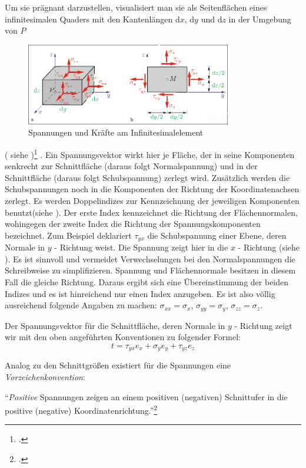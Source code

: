 \documentclass[12pt,a4paper,parskip]{scrartcl}
\begin{document}
{Um sie prägnant darzustellen, visualisiert man sie als Seitenflächen eines infinitesimalen Quaders mit den Kantenlängen d$ x $, d$ y $ und d$ z $ in der Umgebung von $ P $\begin{figure}
  \centering
  \includegraphics[width=0.8\textwidth]{tensor}
  \caption{Spannungen und Kräfte am Infinitesimalelement}
  \label{fig:tensor}
  \end{figure}( siehe )\footcite[Vgl.][44]{tmr} . Ein Spannungsvektor wirkt hier je Fläche, der in seine Komponenten senkrecht zur Schnittfläche (daraus folgt Normalspannung) und in der Schnittfläche (daraus folgt Schubspannung) zerlegt wird. Zusätzlich werden die Schubspannungen noch in die Komponenten der Richtung der Koordinatenachsen zerlegt. Es werden Doppelindizes zur Kennzeichnung der jeweiligen Komponenten benutzt(siehe ). 
Der erste Index kennzeichnet die Richtung der Flächennormalen, wohingegen der zweite Index die Richtung der Spannungskomponenten bezeichnet. Zum Beispiel deklariert $ \tau_{yx} $ die Schubspannung einer Ebene, deren Normale in $y$ - Richtung weist. Die Spannung zeigt hier in die $ x $ - Richtung (siehe ). Es ist sinnvoll und vermeidet Verwechselungen bei den Normalspannungen die Schreibweise zu simplifizieren. Spannung und Flächennormale besitzen in diesem Fall die gleiche Richtung. Daraus ergibt sich eine Übereinstimmung der beiden Indizes und es ist hinreichend nur einen Index anzugeben. Es ist also völlig ausreichend  folgende Angaben zu machen: $ \sigma_{xx} = \sigma_{x} $, $ \sigma_{yy} = \sigma_y $, $ \sigma_{zz} = \sigma_z $.

Der Spannungsvektor für die Schnittfläche, deren Normale in $ y $ - Richtung zeigt wir mit den oben angeführten Konventionen zu folgender Formel:
\begin{equation}
t = \tau_{yx}e_x + \sigma_ye_y + \tau_{yz}e_z
\end{equation}

Analog zu den Schnittgrößen existiert für die Spannungen eine \emph{Vorzeichenkonvention}:

"`\emph{Positive} Spannungen zeigen an einem positiven (negativen) Schnittufer in die positive (negative) Koordinatenrichtung."'\footcite[45]{tmr}

}
\end{document}
